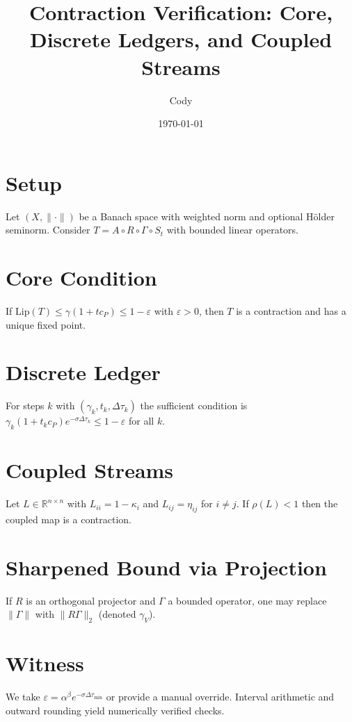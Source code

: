 \documentclass[11pt]{article}
\title{Contraction Verification: Core, Discrete Ledgers, and Coupled Streams}
\author{Cody}
\date{\today}
\begin{document}
\maketitle

\section{Setup}
Let $(X,\|\cdot\|)$ be a Banach space with weighted norm and optional Hölder seminorm. Consider
$T = A \circ R \circ \Gamma \circ S_t$ with bounded linear operators.

\section{Core Condition}
If $\mathrm{Lip}(T) \le \gamma(1 + t c_P) \le 1 - \varepsilon$ with $\varepsilon > 0$, then $T$ is a contraction and has a unique fixed point.

\section{Discrete Ledger}
For steps $k$ with $(\gamma_k,t_k,\Delta\tau_k)$ the sufficient condition is
$\gamma_k (1 + t_k c_P) e^{-\sigma \Delta\tau_k} \le 1 - \varepsilon$ for all $k$.

\section{Coupled Streams}
Let $L \in \mathbb{R}^{n\times n}$ with $L_{ii}=1-\kappa_i$ and $L_{ij}=\eta_{ij}$ for $i\ne j$.
If $\rho(L) < 1$ then the coupled map is a contraction.

\section{Sharpened Bound via Projection}
If $R$ is an orthogonal projector and $\Gamma$ a bounded operator, one may replace $\|\Gamma\|$ with $\|R\Gamma\|_2$ (denoted $\gamma_V$).

\section{Witness}
We take $\varepsilon = \alpha^\beta e^{-\sigma \Delta\tau_{\min}}$ or provide a manual override. Interval arithmetic and outward rounding yield numerically verified checks.
\end{document}
